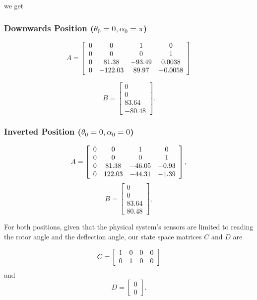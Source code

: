 we get
\subsubsection*{Downwards Position (\( \theta_0=0, \alpha_0=\pi \))}
\[
    A =
    \left[\begin{array}{c c c c}
            0 & 0       & 1      & 0       \\
            0 & 0       & 0      & 1       \\
            0 & 81.38   & -93.49 & 0.0038  \\
            0 & -122.03 & 89.97  & -0.0058 \\
        \end{array}\right]
\]

\[
    B =
    \left[\begin{array}{c}
            0     \\
            0     \\
            83.64 \\
            -80.48
        \end{array}\right].
\]

\subsubsection*{Inverted Position (\( \theta_0=0, \alpha_0=0 \))}
\[
    A =
    \left[\begin{array}{c c c c}
            0 & 0      & 1      & 0     \\
            0 & 0      & 0      & 1     \\
            0 & 81.38  & -46.05 & -0.93 \\
            0 & 122.03 & -44.31 & -1.39
        \end{array}\right],
\]
\[
    B =
    \left[\begin{array}{c}
            0     \\
            0     \\
            83.64 \\
            80.48
        \end{array}\right],
\]

For both positions, given that the physical system’s sensors are limited to reading the rotor angle and the deflection angle, our state space matrices \(C\) and \(D\) are

\[
    C =
    \left[\begin{array}{c c c c}
            1 & 0 & 0 & 0 \\
            0 & 1 & 0 & 0
        \end{array}\right]
\]
and
\[
    D =
    \left[\begin{array}{c}
            0 \\
            0
        \end{array}\right].
\]

